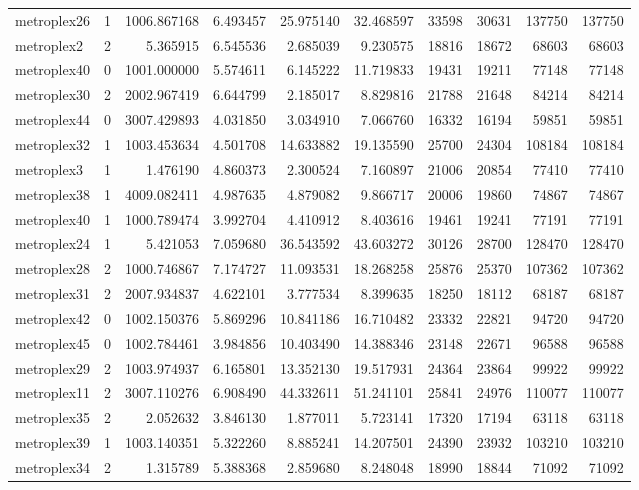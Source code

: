 \begin{longtable}{|l|r|r|r|r|r|r|r|r|r|}
metroplex26 & 1 & 1006.867168 & 6.493457 & 25.975140 & 32.468597 & 33598 & 30631 & 137750 & 137750 \\
metroplex2 & 2 & 5.365915 & 6.545536 & 2.685039 & 9.230575 & 18816 & 18672 & 68603 & 68603 \\
metroplex40 & 0 & 1001.000000 & 5.574611 & 6.145222 & 11.719833 & 19431 & 19211 & 77148 & 77148 \\
metroplex30 & 2 & 2002.967419 & 6.644799 & 2.185017 & 8.829816 & 21788 & 21648 & 84214 & 84214 \\
metroplex44 & 0 & 3007.429893 & 4.031850 & 3.034910 & 7.066760 & 16332 & 16194 & 59851 & 59851 \\
metroplex32 & 1 & 1003.453634 & 4.501708 & 14.633882 & 19.135590 & 25700 & 24304 & 108184 & 108184 \\
metroplex3 & 1 & 1.476190 & 4.860373 & 2.300524 & 7.160897 & 21006 & 20854 & 77410 & 77410 \\
metroplex38 & 1 & 4009.082411 & 4.987635 & 4.879082 & 9.866717 & 20006 & 19860 & 74867 & 74867 \\
metroplex40 & 1 & 1000.789474 & 3.992704 & 4.410912 & 8.403616 & 19461 & 19241 & 77191 & 77191 \\
metroplex24 & 1 & 5.421053 & 7.059680 & 36.543592 & 43.603272 & 30126 & 28700 & 128470 & 128470 \\
metroplex28 & 2 & 1000.746867 & 7.174727 & 11.093531 & 18.268258 & 25876 & 25370 & 107362 & 107362 \\
metroplex31 & 2 & 2007.934837 & 4.622101 & 3.777534 & 8.399635 & 18250 & 18112 & 68187 & 68187 \\
metroplex42 & 0 & 1002.150376 & 5.869296 & 10.841186 & 16.710482 & 23332 & 22821 & 94720 & 94720 \\
metroplex45 & 0 & 1002.784461 & 3.984856 & 10.403490 & 14.388346 & 23148 & 22671 & 96588 & 96588 \\
metroplex29 & 2 & 1003.974937 & 6.165801 & 13.352130 & 19.517931 & 24364 & 23864 & 99922 & 99922 \\
metroplex11 & 2 & 3007.110276 & 6.908490 & 44.332611 & 51.241101 & 25841 & 24976 & 110077 & 110077 \\
metroplex35 & 2 & 2.052632 & 3.846130 & 1.877011 & 5.723141 & 17320 & 17194 & 63118 & 63118 \\
metroplex39 & 1 & 1003.140351 & 5.322260 & 8.885241 & 14.207501 & 24390 & 23932 & 103210 & 103210 \\
metroplex34 & 2 & 1.315789 & 5.388368 & 2.859680 & 8.248048 & 18990 & 18844 & 71092 & 71092 \\

\end{longtable}
